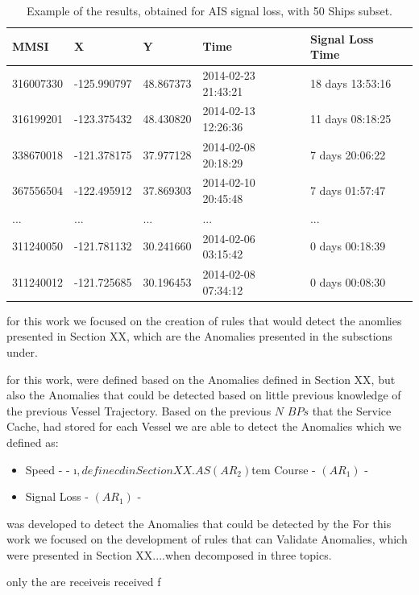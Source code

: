 \begin{table}[H]
\centering
\caption{Example of the results, obtained for AIS signal loss, with 50 Ships subset.}
\label{Table: AIS signal loss}
\begin{tabular}{@{}lllll@{}}
\toprule
MMSI & X & Y & Time & Signal Loss Time \\ \midrule
316007330 & -125.990797 & 48.867373 & 2014-02-23 21:43:21 & 18 days 13:53:16 \\
316199201 & -123.375432 & 48.430820 & 2014-02-13 12:26:36 & 11 days 08:18:25 \\
338670018 & -121.378175 & 37.977128 & 2014-02-08 20:18:29 & 7 days 20:06:22 \\
367556504 & -122.495912 & 37.869303 & 2014-02-10 20:45:48 & 7 days 01:57:47 \\
... & ... & ... & ... & ... \\
311240050 & -121.781132 & 30.241660 & 2014-02-06 03:15:42 & 0 days 00:18:39 \\
311240012 & -121.725685 & 30.196453 & 2014-02-08 07:34:12 & 0 days 00:08:30 \\ 
\bottomrule
\end{tabular}
\end{table}
for this work we focused on the creation of rules that would detect the anomlies presented in Section XX, which are the Anomalies presented in the subsctions under.  

for this work, were defined based on the Anomalies defined in Section XX, but also the Anomalies that could be detected based on little previous knowledge of the previous Vessel Trajectory. Based on the previous $N$ $BPs$ that the Service Cache, had stored for each Vessel we are able to detect the Anomalies which we defined as: 

\begin{itemize}
  \item Speed -  - 
  \i$ , definec d in Section XX. AS  (AR_2)$tem Course - $(AR_1)$ - 
  \item Signal Loss - $(AR_1)$ - 
\end{itemize}

was developed to detect the Anomalies that could be detected by the 
For this work we focused on the development of rules that can Validate Anomalies, which were presented in Section XX....when decomposed in three topics. 



only the are receiveis received f

